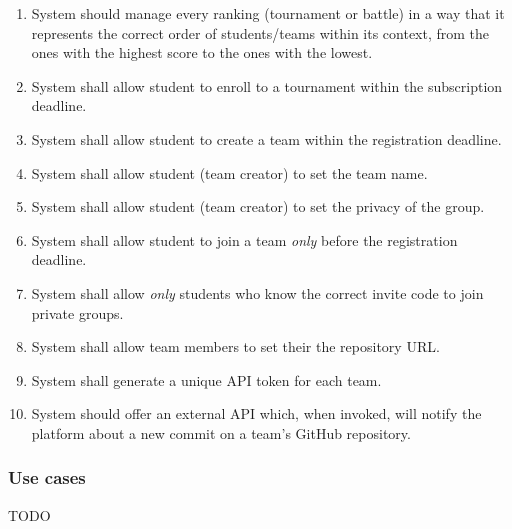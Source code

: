 \begin{enumerate}[label=$\bullet$ \textbf{R\arabic*:}]
    \item System should manage every ranking (tournament or battle) in a way that it represents the correct order of students/teams within its context, from the ones with the highest score to the ones with the lowest.
    \item System shall allow student to enroll to a tournament within the subscription deadline.
    \item System shall allow student to create a team within the registration deadline.
    \item System shall allow student (team creator) to set the team name.
    \item System shall allow student (team creator) to set the privacy of the group.
    \item System shall allow student to join a team \textit{only} before the registration deadline.
    \item System shall allow \textit{only} students who know the correct invite code to join private groups.
    \item System shall allow team members to set their the repository URL.
    \item System shall generate a unique API token for each team.
    \item System should offer an external API which, when invoked, will notify the platform about a new commit on a team’s GitHub repository.
\end{enumerate}
\subsubsection{Use cases}
TODO
